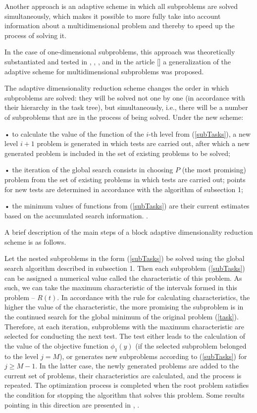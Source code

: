 \documentclass{svproc}
\begin{document}
Another approach is an adaptive scheme in which all subproblems are solved simultaneously, which makes it possible to more fully take into account information about a multidimensional problem and thereby to speed up the process of solving it.

In the case of one-dimensional subproblems, this approach was theoretically substantiated and tested in \cite{Ref28}, \cite{Ref29}, \cite{Ref30}, and in the article [] a generalization of the adaptive scheme for multidimensional subproblems was proposed.

   The adaptive dimensionality reduction scheme changes the order in which subproblems are solved: they will be solved not one by one (in accordance with their hierarchy in the task tree), but simultaneously, i.e., there will be a number of subproblems that are in the process of being solved. Under the new scheme:
   
•	to calculate the value of the function of the \(i\)-th level from (\ref{subTasks}), a new level \(i+1\) problem is generated in which tests are carried out, after which a new generated problem is included in the set of existing problems to be solved;   
   
•	the iteration of the global search consists in choosing \(P\) (the most promising) problem from the set of existing problems in which tests are carried out; points for new tests are determined in accordance with the algorithm of subsection 1; 

•	the minimum values of functions from (\ref{subTasks}) are their current estimates based on the accumulated search information. .

A brief description of the main steps of a block adaptive dimensionality reduction scheme is as follows.

Let the nested subproblems in the form (\ref{subTasks}) be solved using the global search algorithm described in subsection 1. Then each subproblem (\ref{subTasks}) can be assigned a numerical value called the characteristic of this problem. As such, we can take the maximum characteristic of the intervals formed in this problem – \(R(t)\). In accordance with the rule for calculating characteristics, the higher the value of the characteristic, the more promising the subproblem is in the continued search for the global minimum of the original problem (\ref{task}). Therefore, at each iteration, subproblems with the maximum characteristic are selected for conducting the next test. The test either leads to the calculation of the value of the objective function \(\phi_1(y)\) (if the selected subproblem belonged to the level \(j=M\)), or generates new subproblems according to (\ref{subTasks}) for \(j \geqslant  M-1\). In the latter case, the newly generated problems are added to the current set of problems, their characteristics are calculated, and the process is repeated. The optimization process is completed when the root problem satisfies the condition for stopping the algorithm that solves this problem. Some results pointing in this direction are presented in \cite{Ref31}, \cite{Ref32}.
\end{document}
